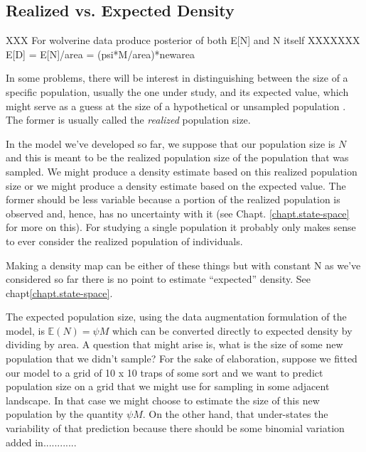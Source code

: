 \subsection{Realized vs. Expected Density}


XXX For wolverine data produce posterior of both E[N] and N itself XXXXXXX
E[D] = E[N]/area = (psi*M/area)*newarea


In some problems, there will be interest in distinguishing between 
the size of a specific population, usually the one under study, and
its expected value, which might serve as a guess at the size of a
hypothetical or unsampled population \citep{efford_fewster:2012}. The former is usually called the
{\it realized} population size.

In the model we've developed so far, we suppose that our population
size is $N$ and this is meant to be the realized population size of
the population that was sampled. We might produce a density estimate
based on this realized population size or we might produce a density
estimate based on the expected value. The former should be less
variable because a portion of the realized population is observed and,
hence, has no uncertainty with it (see Chapt. \ref{chapt.state-space}
for more on this).  For studying a single population it probably only
makes sense to ever consider the realized population of individuals. 

Making a density map can be either of these things but with constant N
as we've considered so far there is no point to estimate ``expected''
density.  See chapt\ref{chapt.state-space}.

The expected population size, using the data augmentation formulation
of the model, is $\mathbb{E}(N) = \psi M$ which can be converted
directly to expected density by dividing by area.
A question that might arise is, what is the size of some new
population that we didn't sample?  For the sake of elaboration,
suppose we fitted our model to a grid of 10 x 10 traps of some sort
and we want to predict population size on a grid that we might use for
sampling in some adjacent landscape. In that case we might choose to
estimate the size of this new population by the quantity $\psi M$. On
the other hand, that under-states the variability of that prediction
because there should be some binomial variation added in............




